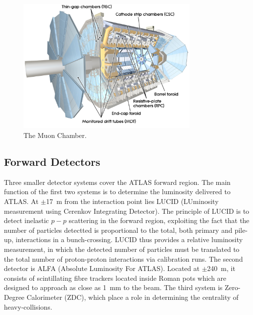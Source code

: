 \begin{figure}[htbp]
  \begin{center}
      \includegraphics[width=0.8\textwidth]{Fig2/MuonChamber.pdf}
    \caption{The Muon Chamber.}
    \label{fig:MUON1}
  \end{center}
\end{figure}

\subsection{Forward Detectors}\label{sec:forward}

Three smaller detector systems cover the ATLAS forward region. The main function of the first two systems is to determine the luminosity delivered to ATLAS. At $\pm$17~m from the interaction point lies LUCID (LUminosity measurement using Cerenkov Integrating Detector). The principle of LUCID is to detect inelastic $p-p$ scattering in the forward region, exploiting the fact that the number of particles detectted is proportional to the total, both primary and pile-up, interactions in a bunch-crossing.  LUCID thus provides a relative luminosity measurement, in which the detected number of particles must be translated to the total number of proton-proton interactions via calibration runs.
The second detector is ALFA (Absolute Luminosity For ATLAS). Located at $\pm$240~m, it consists of scintillating fibre trackers located inside Roman pots which are designed to approach as close as 1~mm to the beam. 
The third system is Zero-Degree Calorimeter (ZDC), which place a role in determining the centrality of heavy-collisions.




